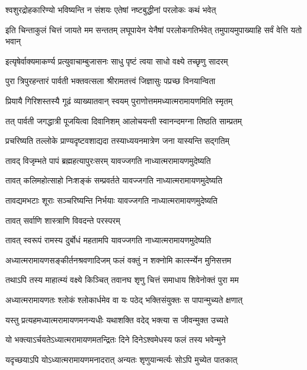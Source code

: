 \twolineshloka
{श्वशुरद्रोहकारिण्यो भविष्यन्ति न संशयः}
{एतेषां नष्टबुद्धीनां परलोकः कथं भवेत्} %

\threelineshloka
{इति चिन्ताकुलं चित्तं जायते मम सन्ततम्}
{लघूपायेन येनैषां परलोकगतिर्भवेत्}
{तमुपायमुपाख्याहि सर्वं वेत्ति यतो भवान्} %

\twolineshloka
{इत्यृषेर्वाक्यमाकर्ण्य प्रत्युवाचाम्बुजासनः}
{साधु पृष्टं त्वया साधो वक्ष्ये तच्छृणु सादरम्} %

\twolineshloka
{पुरा त्रिपुरहन्तारं पार्वती भक्तवत्सला}
{श्रीरामतत्त्वं जिज्ञासुः पप्रच्छ विनयान्विता} %

\twolineshloka
{प्रियायै गिरिशस्तस्यै गूढं व्याख्यातवान् स्वयम्}
{पुराणोत्तममध्यात्मरामायणमिति स्मृतम्} %

\twolineshloka
{तत् पार्वती जगद्धात्री पूजयित्वा दिवानिशम्}
{आलोचयन्ती स्वानन्दमग्ना तिष्ठति साम्प्रतम्} %

\twolineshloka
{प्रचरिष्यति तल्लोके प्राण्यदृष्टवशाद्यदा}
{तस्याध्ययनमात्रेण जना यास्यन्ति सद्गतिम्} %

\twolineshloka
{तावद् विजृम्भते पापं ब्रह्महत्यापुरःसरम्}
{यावज्जगति नाध्यात्मरामायणमुदेष्यति} %

\twolineshloka
{तावत् कलिमहोत्साहो निःशङ्कं सम्प्रवर्तते}
{यावज्जगति नाध्यात्मरामायणमुदेष्यति} %

\twolineshloka
{तावद्यमभटाः शूराः सञ्चरिष्यन्ति निर्भयाः}
{यावज्जगति नाध्यात्मरामायणमुदेष्यति} %

\onelineshloka
{तावत् सर्वाणि शास्त्राणि विवदन्ते परस्परम्} %

\twolineshloka
{तावत् स्वरूपं रामस्य दुर्बोधं महतामपि}
{यावज्जगति नाध्यात्मरामायणमुदेष्यति} %

\twolineshloka
{अध्यात्मरामायणसङ्कीर्तनश्रवणादिजम्}
{फलं वक्तुं न शक्नोमि कार्त्स्न्येन मुनिसत्तम} %

\twolineshloka
{तथाऽपि तस्य माहात्म्यं वक्ष्ये किञ्चित् तवानघ}
{शृणु चित्तं समाधाय शिवेनोक्तं पुरा मम} %

\twolineshloka
{अध्यात्मरामायणतः श्लोकं श्लोकार्धमेव वा}
{यः पठेद् भक्तिसंयुक्तः स पापान्मुच्यते क्षणात्} %

\twolineshloka
{यस्तु प्रत्यहमध्यात्मरामायणमनन्यधीः}
{यथाशक्ति वदेद् भक्त्या स जीवन्मुक्त उच्यते} %

\twolineshloka
{यो भक्त्याऽर्चयतेऽध्यात्मरामायणमतन्द्रितः}
{दिने दिनेऽश्वमेधस्य फलं तस्य भवेन्मुने} %

\twolineshloka
{यदृच्छयाऽपि योऽध्यात्मरामायणमनादरात्}
{अन्यतः शृणुयान्मर्त्यः सोऽपि मुच्येत पातकात्} %

